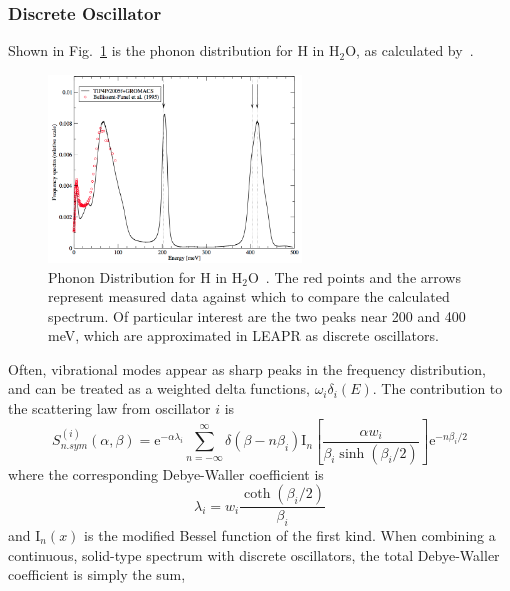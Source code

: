 \documentclass[../master.tex]{subfiles}
\begin{document}
			\subsubsection{Discrete Oscillator}
				Shown in Fig.~\ref{fig:phononDist} is the phonon distribution for H in H$_2$O, as calculated by~\cite{phononModel}.
				\begin{figure}[h]
				    \centering
				    \includegraphics[width=0.6\textwidth]{images/HinH2OphononDist75.png}
				    \caption[Phonon Distribution for H in H$_2$O]{Phonon Distribution for H in H$_2$O~\cite{phononModel}. The red points and the arrows represent measured data against which to compare the calculated spectrum. Of particular interest are the two peaks near 200 and 400 meV, which are approximated in LEAPR as discrete oscillators.}
				    \label{fig:phononDist}
				\end{figure}
                                Often, vibrational modes appear as sharp peaks in the frequency distribution, and can be treated as a weighted delta functions, $\omega_i\delta_i(E)$. The contribution to the scattering law from oscillator $i$ is 
				\begin{equation}
                                  S^{(i)}_{n.sym}(\alpha,\beta)=\mathrm{e}^{-\alpha\lambda_{i}}\sum_{n=-\infty}^{\infty}\delta\left(\beta-n\beta_{i}\right)\mathrm{I}_{n}\left[\frac{\alpha w_{i}}{\beta_{i}\sinh\left(\beta_{i}/2\right)}\right]\mathrm{e}^{-n\beta_{i}/2}\label{eq:longDeltaFunctionSAB}
				\end{equation}
                                where the corresponding Debye-Waller coefficient is 
                                \begin{equation}
                                        \lambda_{i}=w_{i}\frac{\operatorname{coth}\left(\beta_{i}/2\right)}{\beta_{i}}
                                \end{equation}
                                and $\mathrm{I}_n(x)$ is the modified Bessel function of the first kind. When combining a continuous, solid-type spectrum with discrete oscillators, the total Debye-Waller coefficient is simply the sum,
\end{document}
